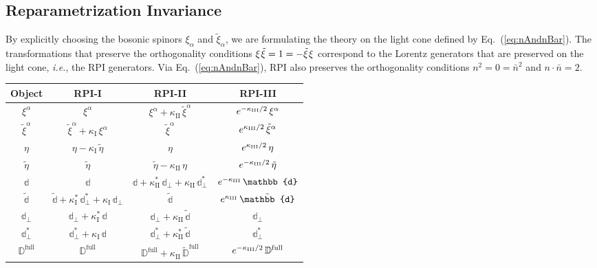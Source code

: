 \documentclass[12pt,document,nofootinbib,superscriptaddress,onecolumn,preprintnumbers,balancelastpage]{article}
\newcommand{\rpii}{{\kappa_\text{I}}}
\newcommand{\rpiii}{{\kappa_\text{II}}}
\newcommand{\rpiiC}{{\kappa^*_\text{I}}}
\newcommand{\rpiiiC}{{\kappa^*_\text{II}}}
\newcommand{\full}{\text{full}}
\newcommand{\s}{\hspace{0.8pt}}
\newcommand{\PP}{\mathbb{d}}
\DeclareRobustCommand{\Eq}[1]{Eq.~(\ref{#1})}
\newcommand{\D}{\mathbb{D}}
\begin{document}
\begin{spacing}{1.2}
\subsection{Reparametrization Invariance}

By explicitly choosing the bosonic spinors $\xi_\alpha$ and $\tilde{\xi}_\alpha$, we are formulating the theory on the light cone defined by \Eq{eq:nAndnBar}.
%
The transformations that preserve the orthogonality conditions $\xi\s \tilde{\xi} = 1 = -\tilde{\xi}\s  \xi$ correspond to the Lorentz generators that are preserved on the light cone, \emph{i.e.}, the RPI generators.
%
Via \Eq{eq:nAndnBar}, RPI also preserves the orthogonality conditions $n^2 = 0 = \bar{n}^2$ and $n\cdot \bar{n} = 2$.



\begin{table}[t]
\renewcommand{\arraystretch}{1.8}
\setlength{\arrayrulewidth}{.3mm}
\centering
\small
\setlength{\tabcolsep}{0.45 em}
\begin{tabular}{ |c || c | c | c|}
\hline
 Object &  RPI-I & RPI-II &   RPI-III    \\
 \hline
 \hline
 $\xi^\alpha  $ &     $\xi^\alpha$    & $\xi^\alpha + \rpiii \,\tilde{\xi}^\alpha$ &   $e^{-\kappa_{\rm III}/2 }\, \xi^\alpha $  \\
 $\tilde{\xi}^\alpha $  & $\tilde{\xi}^\alpha + \rpii \,\xi^\alpha$  & $\tilde{\xi}^\alpha$ &    $  e^{\kappa_{\rm III}/2 }\, \tilde{\xi}^\alpha $ \\
\hline
  $\eta $  & $\eta- \rpii\, \tilde{\eta}$   & $\eta$ &    $ e^{\kappa_{\rm III}/2 }\,\eta $ \\ 
  $\tilde{\eta} $  & $\tilde{\eta} $   & $\tilde{\eta} - \rpiii\, \eta$ &    $ e^{-\kappa_{\rm III}/2 } \,\tilde{\eta}$ \\
  \hline
    $\PP $ &  $\PP$   & $\PP + \rpiiiC\, \PP_\perp + \rpiii \,\PP_\perp^*$ & $e^{-\kappa_{\rm III}}\, \PP $ \\ 
  $\tilde{\PP} $ &  $  \tilde{\PP} + \rpiiC\, \PP_\perp^* + \rpii\, \PP_\perp$  & $\tilde{\PP} $ &  $e^{\kappa_{\rm III}}\, \tilde{\PP} $ \\ 
 $\PP_\perp $ &   $ \PP_\perp +\rpiiC \, \PP$   & $\PP_\perp + \rpiii\, \tilde{\PP}$ & $\PP_\perp $ \\ 
  $\PP_\perp^* $ &   $ \PP_\perp^*  + \rpii \, \PP $   & $\PP_\perp^* + \rpiiiC\, \tilde{\PP}$ & $\PP_\perp^*  $ \\
  \hline
        $\D^\full $  &  $\D^\full $   & $\D^\full + \rpiii\, \tilde{\D}^\full $  &    $ e^{-\kappa_{\rm III}/2 }\, \D^\full$ \\

\end{tabular}
\end{table}
\end{spacing}
\end{document}
